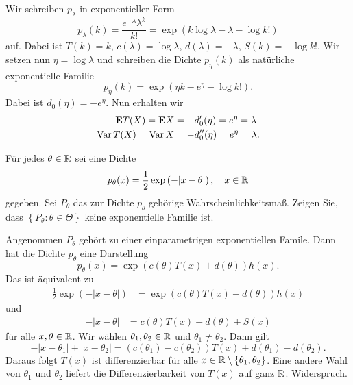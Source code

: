 \solution
Wir schreiben $p_\lambda$ in exponentieller Form
\begin{equation*}
    p_{\lambda}(k) = \frac{e^{-\lambda} \lambda^{k}}{k!} =
    \exp \left( k \log \lambda - \lambda - \log k! \right)
\end{equation*}
auf. Dabei ist $T(k) = k$, $c(\lambda)= \log \lambda$, $d(\lambda)= -\lambda$, 
$S(k) = - \log k!$. Wir setzen nun $\eta=\log \lambda$ und schreiben die Dichte 
$p_{\eta}(k)$ als natürliche exponentielle Familie
\begin{equation*}
    p_{\eta}(k) = \exp \left( \eta k - e^{\eta} - \log k! \right).
\end{equation*}
Dabei ist $d_0(\eta) = - e^{\eta}$. Nun erhalten wir 
\begin{align*}
    \mathbf{E} T(X) = \mathbf{E} X &= - d_0'(\eta) = e^{\eta} = \lambda \\
    \operatorname{Var} T(X) = \operatorname{Var} X &= -d_0''(\eta) = e^{\eta} = \lambda.
\end{align*}




Für jedes $\theta\in\mathbb R$ sei eine Dichte
\begin{equation*} 
    p_\theta(x) = \frac{1}{2} \exp\left( -| x-\theta| \right), \quad x\in\mathbb R
\end{equation*}
gegeben. Sei $P_\theta$ das zur Dichte $p_\theta$ gehörige
Wahrscheinlichkeitsmaß.  Zeigen Sie, dass $\left\{ P_\theta : \theta\in\Theta
\right\}$ keine exponentielle Familie ist.

\solution
Angenommen $P_\theta$ gehört zu einer einparametrigen exponentiellen Famile.
Dann hat die Dichte $p_\theta$ eine Darstellung
\begin{equation*}
	p_\theta(x) = \exp\left( c(\theta) T(x) + d(\theta) \right)h(x).
\end{equation*}
Das ist äquivalent zu
\begin{align*}
	\frac{1}{2} \exp \left( -| x - \theta | \right) &= 
		\exp\left( c(\theta) T(x) + d(\theta) \right)h(x)
\end{align*}
und
\begin{align*}
    -|x-\theta| &= c(\theta) T(x) + d(\theta) + S(x)
\end{align*}
für alle $x,\theta\in\mathbb R$. Wir wählen $\theta_1, \theta_2\in\mathbb R$ und 
$\theta_1 \neq \theta_2$. Dann gilt
\begin{equation*}
	- |x-\theta_1| + |x-\theta_2| = 
	\left( c(\theta_1)-c(\theta_2) \right)T(x) + d(\theta_1)-d(\theta_2).
\end{equation*}
Daraus folgt $T(x)$ ist differenzierbar für alle $x\in\mathbb R\setminus \left\{
\theta_1,\theta_2 \right\}$. Eine andere Wahl von $\theta_1$ und $\theta_2$
liefert die Differenzierbarkeit von $T(x)$ auf ganz $\mathbb R$. Widerspruch.  



